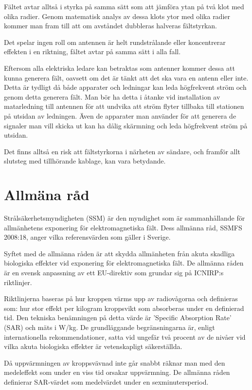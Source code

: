 Fältet avtar alltså i styrka på samma sätt som att jämföra ytan på två
klot med olika radier. Genom matematisk analys av dessa klots ytor med
olika radier kommer man fram till att om avståndet dubbleras halveras
fältstyrkan.

Det spelar ingen roll om antennen är helt rundstrålande eller
koncentrerar effekten i en riktning, fältet avtar på samma sätt i
alla fall.

Eftersom alla elektriska ledare kan betraktas som antenner kommer
dessa att kunna generera fält, oavsett om det är tänkt att det ska
vara en antenn eller inte. Detta är tydligt då både apparater och
ledningar kan leda högfrekvent ström och genom detta generera fält.
Man bör ha detta i åtanke vid installation av matarledning till
antennen för att undvika att ström flyter tillbaka till stationen på
utsidan av ledningen. Även de apparater man använder för att generera
de signaler man vill skicka ut kan ha dålig skärmning och leda
högfrekvent ström på utsidan.

Det finns alltså en risk att fältstyrkorna i närheten av sändare, och
framför allt slutsteg med tillhörande kablage, kan vara betydande.

\section{Allmäna råd}

Strålsäkerhetsmyndigheten (SSM) är den myndighet som är sammanhållande
för allmänhetens exponering för elektromagnetiska fält. Dess allmänna
råd, SSMFS 2008:18, anger vilka referensvärden som gäller i Sverige.

Syftet med de allmänna råden är att skydda allmänheten från akuta
skadliga biologiska effekter vid exponering för elektromagnetiska fält.
De allmänna råden är en svensk anpassning av ett EU-direktiv som
grundar sig på ICNIRP:s riktlinjer.

Riktlinjerna baseras på hur kroppen värms upp av radiovågorna och
definieras som: hur stor effekt per kilogram kroppsvikt som absorberas
under en definierad tid. Den tekniska benämningen på detta värde är
'Specific Absorption Rate' (SAR) och mäts i W/kg.
De grundläggande begränsningarna är, enligt internationella
rekommendationer, satta vid ungefär två procent av de nivåer vid
vilka akuta biologiska effekter är vetenskapligt säkerställda.

Då uppvärmningen av kroppsvävnad inte går snabbt räknar man med den
medeleffekt som under en viss tid orsakar uppvärmning. De allmänna
råden definierar SAR-värdet som medelvärdet under en sexminutersperiod.

